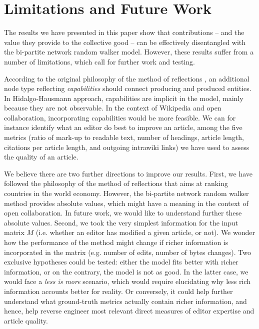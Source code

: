 \section{Limitations and Future Work}
The results we have presented in this paper show that contributions -- and the value they provide to the collective good -- can be effectively disentangled with the {bi-partite network random walker} model. However, these results suffer from a number of limitations, which call for further work and testing. 


According to the original philosophy of the method of reflections \cite{hidalgo2007}, an additional node type reflecting {\it capabilities} should connect producing and produced entities. In Hidalgo-Hausmann approach, capabilities are implicit in the model, mainly because they are not observable. In the context of Wikipedia and open collaboration, incorporating capabilities would be more feasible. We can for instance identify what an editor do best to improve an article, among the five metrics (ratio of mark-up to readable text, number of headings, article length, citations per article length, and outgoing intrawiki links) we have used to assess the quality of an article.

We believe there are two further directions to improve our results. First, we have followed the philosophy of the method of reflections that aims at ranking countries in the world economy. However, the bi-partite network random walker method provides absolute values, which might have a meaning in the context of open collaboration. In future work, we would like to understand further these absolute values. Second, we took the very simplest information for the input matrix $\mathbf{\mathit{M}}$ (i.e. whether an editor has modified a given article, or not). We wonder how the performance of the method might change if richer information is incorporated in the matrix (e.g. number of edits, number of bytes changes). Two exclusive hypotheses could be tested: either the model fits better with richer information, or on the contrary, the model is not as good. In the latter case, we would face a {\it less is more} scenario, which would require elucidating why less rich information accounts better for reality. Or conversely, it could help further understand what ground-truth metrics actually contain richer information, and hence, help reverse engineer most relevant direct measures of editor expertise and article quality.

